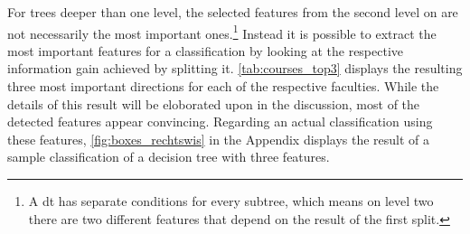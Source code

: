\begin{figure}[h]
	\begin{center}
	\end{center}
\end{figure}

For trees deeper than one level, the selected features from the second level on are not necessarily the most important ones.\footnote{A \gls{dt} has separate conditions for every subtree, which means on level two there are two different features that depend on the result of the first split.} Instead it is possible to extract the most important features for a classification by looking at the respective information gain achieved by splitting it. \autoref{tab:courses_top3} displays the resulting three most important directions for each of the respective faculties. While the details of this result will be eloborated upon in the discussion, most of the detected features appear convincing. Regarding an actual classification using these features, \autoref{fig:boxes_rechtswis} in the Appendix displays the result of a sample classification of a decision tree with three features.


